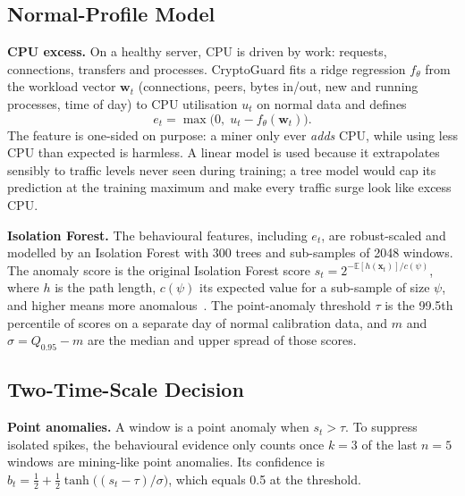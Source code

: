 \documentclass[conference]{IEEEtran}
\begin{document}
\subsection{Normal-Profile Model}
\textbf{CPU excess.} On a healthy server, CPU is driven by work: requests, connections, transfers and processes. CryptoGuard fits a ridge regression $f_\theta$ from the workload vector $\mathbf{w}_t$ (connections, peers, bytes in/out, new and running processes, time of day) to CPU utilisation $u_t$ on normal data and defines
\begin{equation}
  e_t = \max\!\big(0,\; u_t - f_\theta(\mathbf{w}_t)\big).
  \label{eq:excess}
\end{equation}
The feature is one-sided on purpose: a miner only ever \emph{adds} CPU, while using less CPU than expected is harmless. A linear model is used because it extrapolates sensibly to traffic levels never seen during training; a tree model would cap its prediction at the training maximum and make every traffic surge look like excess CPU.

\textbf{Isolation Forest.} The behavioural features, including $e_t$, are robust-scaled and modelled by an Isolation Forest with 300 trees and sub-samples of 2048 windows. The anomaly score is the original Isolation Forest score $s_t = 2^{-\mathbb{E}[h(\mathbf{x}_t)]/c(\psi)}$, where $h$ is the path length, $c(\psi)$ its expected value for a sub-sample of size $\psi$, and higher means more anomalous~\cite{liu2008iforest,pedregosa2011}. The point-anomaly threshold $\tau$ is the 99.5th percentile of scores on a separate day of normal calibration data, and $m$ and $\sigma = Q_{0.95}-m$ are the median and upper spread of those scores.

\subsection{Two-Time-Scale Decision}
\textbf{Point anomalies.} A window is a point anomaly when $s_t>\tau$. To suppress isolated spikes, the behavioural evidence only counts once $k=3$ of the last $n=5$ windows are mining-like point anomalies. Its confidence is $b_t = \tfrac12 + \tfrac12\tanh\!\big((s_t-\tau)/\sigma\big)$, which equals 0.5 at the threshold.
\end{document}
